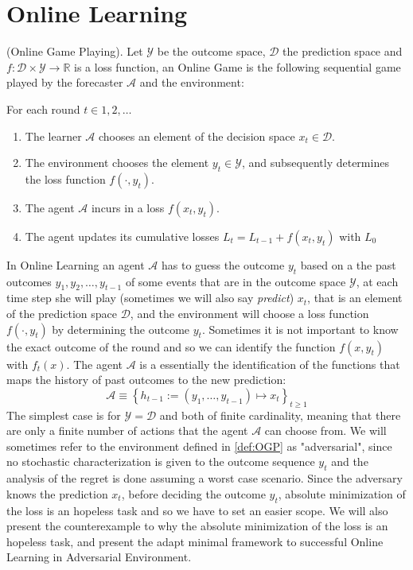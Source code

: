 \section{Online Learning}
\label{sec:OnlineLearning}
\begin{definition}(Online Game Playing).\label{def:OGP}
    Let $\mathcal Y$ be the outcome space, $\mathcal D$ the prediction space and $f:\mathcal D\times\mathcal Y\to \mathbb R$ is a loss function, an Online Game is the following sequential game played by the forecaster $\mathcal A$ and the environment:

    For each round $t\in 1,2,\ldots$
    \begin{enumerate}
        \item The learner $\mathcal A$ chooses an element of the decision space $x_t\in\mathcal D$.
        \item The environment chooses the element $y_t\in\mathcal Y$, and subsequently determines the loss function $f(\cdot,y_t)$.
        \item The agent $\mathcal A$ incurs in a loss $f(x_t,y_t)$.
		\item The agent updates its cumulative losses $L_t=L_{t-1}+f(x_t,y_t)$ with $L_0$
    \end{enumerate}
\end{definition}

In Online Learning an agent $\mathcal A$ has to guess the outcome $y_t$ based on a the past outcomes $y_1,y_2,\ldots,y_{t-1}$ of some events that are in the outcome space $\mathcal Y$, at each time step she will play (sometimes we will also say \emph{predict}) $x_t$, that is an element of the prediction space $\mathcal D$, and the environment will choose a loss function $f(\cdot,y_t)$ by determining the outcome $y_t$.
Sometimes it is not important to know the exact outcome of the round and so we can identify the function $f(x,y_t)$ with $f_t(x)$. The agent $\mathcal A$ is a essentially the identification of the functions that maps the history of past outcomes to the new prediction:
$$\mathcal A\equiv\left\{h_{t-1}:=(y_1,\ldots,y_{t-1})\longmapsto x_t\right\}_{t\ge 1} $$
The simplest case is for $\mathcal Y=\mathcal D$ and both of finite cardinality, meaning that there are only a finite number of actions that the agent $\mathcal A$ can choose from. 
We will sometimes refer to the environment defined in \ref{def:OGP} as "adversarial", since no stochastic characterization is given to the outcome sequence $y_t$ and the analysis of the regret is done assuming a worst case scenario.
Since the adversary knows the prediction $x_t$, before deciding the outcome $y_t$, absolute minimization of the loss is an hopeless task and so we have to set an easier scope. We will also present the counterexample to why the absolute minimization of the loss is an hopeless task, and present the adapt minimal framework to successful Online Learning in Adversarial Environment.

